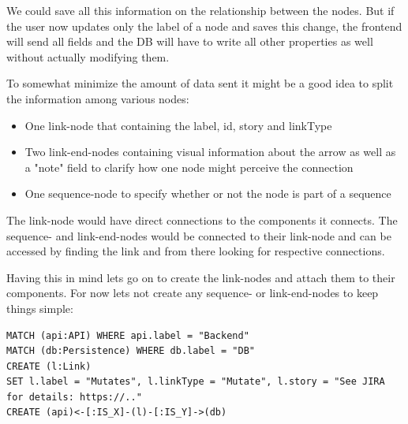 We could save all this information on the relationship between the nodes. But if the user now updates only the label of a node and saves this change, the frontend will send all fields and the DB will have to write all other properties as well without actually modifying them.

To somewhat minimize the amount of data sent it might be a good idea to split the information among various nodes:
\begin{itemize}
\item One link-node that containing the label, id, story and linkType
\item Two link-end-nodes containing visual information about the arrow as well as a "note" field to clarify how one node might perceive the connection
\item One sequence-node to specify whether or not the node is part of a sequence
\end{itemize}

The link-node would have direct connections to the components it connects. The sequence- and link-end-nodes would be connected to their link-node and can be accessed by finding the link and from there looking for respective connections.

Having this in mind lets go on to create the link-nodes and attach them to their components. For now lets not create any sequence- or link-end-nodes to keep things simple:

\begin{lstlisting}[caption={Creating and Connecting the First Link}]
MATCH (api:API) WHERE api.label = "Backend"
MATCH (db:Persistence) WHERE db.label = "DB"
CREATE (l:Link)
SET l.label = "Mutates", l.linkType = "Mutate", l.story = "See JIRA for details: https://.."
CREATE (api)<-[:IS_X]-(l)-[:IS_Y]->(db)
\end{lstlisting}

